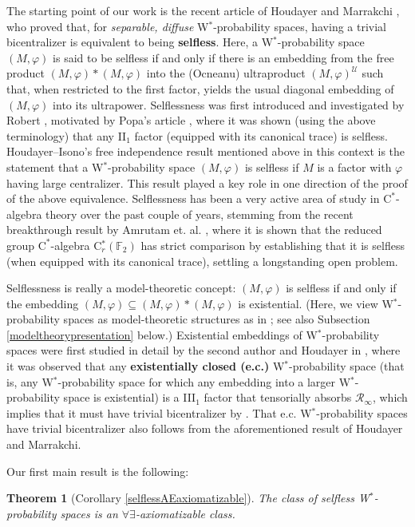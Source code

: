 \documentclass[12pt]{amsart}
\newtheorem*{thm*}{Theorem}
\theoremstyle{definition}
\def\bb{\mathbb}
\def\bb{\mathbb}
\def\u{\mathsf 1}
\newcommand{\cstar}{$\mathrm{C}^*$}
\def \u{\mathcal U}
\begin{document}
The starting point of our work is the recent article of Houdayer and Marrakchi \cite{cyrilamine}, who proved that, for \emph{separable, diffuse} W$^*$-probability spaces, having a trivial bicentralizer is equivalent to being \textbf{selfless}. Here, a W$^*$-probability space $(M,\varphi)$ is said to be selfless if and only if there is an embedding from the free product $(M,\varphi)*(M,\varphi)$ into the (Ocneanu) ultraproduct $(M,\varphi)^\u$ such that, when restricted to the first factor, yields the usual diagonal embedding of $(M,\varphi)$ into its ultrapower. 
Selflessness was first introduced and investigated by Robert \cite{robert2025selfless}, motivated by Popa's article \cite{popa1995free}, where it was shown (using the above terminology) that any II$_1$ factor (equipped with its canonical trace) is selfless. Houdayer--Isono's free independence result mentioned above in this context is the statement that a W$^*$-probability space $(M,\varphi)$ is selfless if $M$ is a factor with $\varphi$ having large centralizer. This result played a key role in one direction of the proof of the above equivalence. Selflessness has been a very active area of study in \cstar-algebra theory over the past couple of years, stemming from the recent breakthrough result by Amrutam et. al. \cite{amrutam2025strict}, where it is shown that the reduced group \cstar-algebra C$^*_r(\bb F_2)$ has strict comparison by establishing that it is selfless (when equipped with its canonical trace), settling a longstanding open problem.

Selflessness is really a model-theoretic concept:  $(M,\varphi)$ is selfless if and only if the embedding $(M,\varphi)\subseteq (M,\varphi)*(M,\varphi)$ is existential.  (Here, we view W$^*$-probability spaces as model-theoretic structures as in \cite{AGHS25}; see also Subsection \ref{modeltheorypresentation} below.)  Existential embeddings of W$^*$-probability spaces were first studied in detail by the second author and Houdayer in \cite{goldbringhoudayer}, where it was observed that any \textbf{existentially closed (e.c.)} W$^*$-probability space (that is, any W$^*$-probability space for which any embedding into a larger W$^*$-probability space is existential) is a III$_1$ factor that tensorially absorbs $\mathcal R_\infty$, which implies that it must have trivial bicentralizer by \cite[Theorem D]{Marrakchi20}.  That e.c. W$^*$-probability spaces have trivial bicentralizer also follows from the aforementioned result of Houdayer and Marrakchi.

Our first main result is the following:
\begin{thm*}[Corollary \ref{selflessAEaxiomatizable}]
The class of selfless W$^*$-probability spaces is an $\forall\exists$-axiomatizable class.   
\end{thm*}
\end{document}

